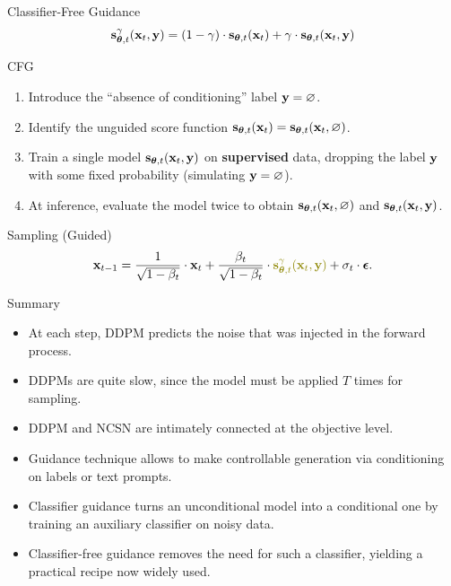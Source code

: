 \documentclass{beamer}
\begin{document}
\begin{frame}{Classifier-Free Guidance}
	\[
		\mathbf{s}^{\gamma}_{\boldsymbol{\theta}, t}(\mathbf{x}_t, \mathbf{y}) = (1 - \gamma) \cdot \mathbf{s}_{\boldsymbol{\theta}, t}(\mathbf{x}_t) +  \gamma \cdot \mathbf{s}_{\boldsymbol{\theta}, t}(\mathbf{x}_t, \mathbf{y})
	\]
	\vspace{-0.5cm}
	\begin{block}{CFG}
		\begin{enumerate}
			\item Introduce the ``absence of conditioning'' label $\mathbf{y} = \varnothing$.
			\item Identify the unguided score function $\mathbf{s}_{\boldsymbol{\theta}, t}(\mathbf{x}_t) = \mathbf{s}_{\boldsymbol{\theta}, t}(\mathbf{x}_t, \varnothing)$.
			\item Train a single model $\mathbf{s}_{\boldsymbol{\theta}, t}(\mathbf{x}_t, \mathbf{y})$ on \textbf{supervised} data, dropping the label $\mathbf{y}$ with some fixed probability (simulating $\mathbf{y} = \varnothing$).
			\item At inference, evaluate the model twice to obtain $\mathbf{s}_{\boldsymbol{\theta}, t}(\mathbf{x}_t, \varnothing)$ and $\mathbf{s}_{\boldsymbol{\theta}, t}(\mathbf{x}_t, \mathbf{y})$.
		\end{enumerate}
	\end{block}
	\vspace{-0.3cm}
	\eqpause
	\begin{block}{Sampling (Guided)}
		\vspace{-0.3cm}
		\[
			\bx_{t-1} = \frac{1}{\sqrt{1 - \beta_t}} \cdot \bx_t + \frac{\beta_t}{\sqrt{1 - \beta_t}} \cdot  {\color{olive}\bs^{\gamma}_{\btheta, t}(\bx_t, \by)} + \sigma_t \cdot \bepsilon.
		\]
		\vspace{-0.3cm}
	\end{block}
\end{frame}
\begin{frame}{Summary}
    \begin{itemize}
        \item At each step, DDPM predicts the noise that was injected in the forward process. 
        \vfill
        \item DDPMs are quite slow, since the model must be applied $T$ times for sampling.	
		\vfill
		\item DDPM and NCSN are intimately connected at the objective level.
		\vfill
		\item Guidance technique allows to make controllable generation via conditioning on labels or text prompts.
        \vfill 
		\item Classifier guidance turns an unconditional model into a conditional one by training an auxiliary classifier on noisy data.
		\vfill
		\item Classifier-free guidance removes the need for such a classifier, yielding a practical recipe now widely used.
    \end{itemize}
\end{frame}
\end{document}
